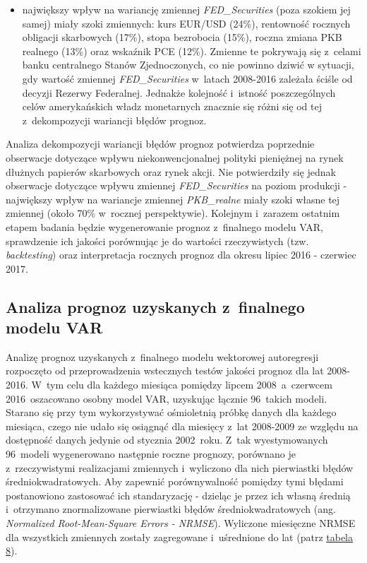 \begin{itemize}
\item największy wpływ na wariancję zmiennej \textit{FED_Securities} (poza szokiem jej samej) miały szoki zmiennych: kurs EUR/USD (24\%), rentowność rocznych obligacji skarbowych (17\%), stopa bezrobocia (15\%), roczna zmiana \acs{PKB} realnego (13\%) oraz wskaźnik \acs{PCE} (12\%). Zmienne te pokrywają się z~celami banku centralnego Stanów Zjednoczonych, co nie powinno dziwić w sytuacji, gdy wartość zmiennej \textit{FED_Securities} w~latach 2008-2016 zależała ściśle od decyzji Rezerwy Federalnej. Jednakże kolejność i~istność poszczególnych celów amerykańskich władz monetarnych znacznie się różni się od tej z~dekompozycji wariancji błędów prognoz.
\end{itemize}

Analiza dekompozycji wariancji błędów prognoz potwierdza poprzednie obserwacje dotyczące wpływu niekonwencjonalnej polityki pieniężnej na rynek dłużnych papierów skarbowych oraz rynek akcji. Nie potwierdziły się jednak obserwacje dotyczące wpływu zmiennej \textit{FED_Securities} na poziom produkcji - największy wpływ na wariancje zmiennej \textit{PKB_realne} miały szoki własne tej zmiennej (około 70\% w~rocznej perspektywie). Kolejnym i~zarazem ostatnim etapem badania będzie wygenerowanie prognoz z~finalnego modelu \acs{VAR}, sprawdzenie ich jakości porównując je do wartości rzeczywistych (tzw. \textit{backtesting}) oraz interpretacja rocznych prognoz dla okresu lipiec 2016 - czerwiec 2017.

\subsection*{\normalsize{Analiza prognoz uzyskanych z~finalnego modelu VAR}}

Analizę prognoz uzyskanych z~finalnego modelu wektorowej autoregresji rozpoczęto od przeprowadzenia wstecznych testów jakości prognoz dla lat 2008-2016. W~tym celu dla każdego miesiąca pomiędzy lipcem 2008~a~czerwcem 2016~oszacowano osobny model \acs{VAR}, uzyskując łącznie 96~takich modeli. Starano się przy tym wykorzystywać ośmioletnią próbkę danych dla każdego miesiąca, czego nie udało się osiągnąć dla miesięcy z~lat 2008-2009 ze względu na dostępność danych jedynie od stycznia 2002~roku. Z~tak wyestymowanych 96~modeli wygenerowano następnie roczne prognozy, porównano je z~rzeczywistymi realizacjami zmiennych i~wyliczono dla nich pierwiastki błędów średniokwadratowych. Aby zapewnić porównywalność pomiędzy tymi błędami postanowiono zastosować ich standaryzację - dzieląc je przez ich własną średnią i~otrzymano znormalizowane pierwiastki błędów średniokwadratowych (ang. \textit{Normalized Root-Mean-Square Errors - NRMSE}). Wyliczone miesięczne \acs{NRMSE} dla wszystkich zmiennych zostały zagregowane i~uśrednione do lat (patrz \hyperlink{tab7}{tabela 8}). 


